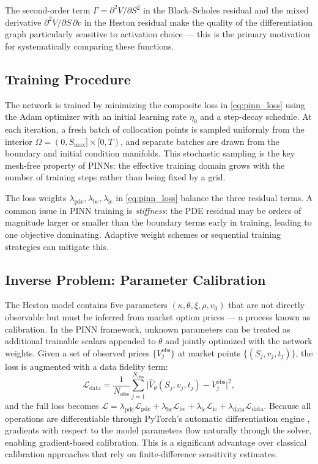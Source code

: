 The second-order term $\Gamma = \partial^2 V/\partial S^2$ in the Black--Scholes residual and the mixed derivative $\partial^2 V/\partial S\,\partial v$ in the Heston residual make the quality of the differentiation graph particularly sensitive to activation choice — this is the primary motivation for systematically comparing these functions.

\subsection{Training Procedure}\label{subsection:training}

The network is trained by minimizing the composite loss in \cref{eq:pinn_loss} using the Adam optimizer \parencite{kingma2015adam} with an initial learning rate $\eta_0$ and a step-decay schedule. At each iteration, a fresh batch of collocation points is sampled uniformly from the interior $\Omega = (0, S_{\max}]\times[0,T)$, and separate batches are drawn from the boundary and initial condition manifolds. This stochastic sampling is the key mesh-free property of PINNs: the effective training domain grows with the number of training steps rather than being fixed by a grid.

The loss weights $\lambda_\text{pde},\lambda_\text{bc},\lambda_\text{ic}$ in \cref{eq:pinn_loss} balance the three residual terms. A common issue in PINN training is \emph{stiffness}: the PDE residual may be orders of magnitude larger or smaller than the boundary terms early in training, leading to one objective dominating. Adaptive weight schemes or sequential training strategies can mitigate this.

\subsection{Inverse Problem: Parameter Calibration}\label{subsection:inverse}

The Heston model contains five parameters $(\kappa, \theta, \xi, \rho, v_0)$ that are not directly observable but must be inferred from market option prices — a process known as calibration. In the PINN framework, unknown parameters can be treated as additional trainable scalars appended to $\theta$ and jointly optimized with the network weights. Given a set of observed prices $\{V^\text{obs}_j\}$ at market points $\{(S_j, v_j, t_j)\}$, the loss is augmented with a data fidelity term:
\[
\mathcal{L}_\text{data} = \frac{1}{N_\text{obs}}\sum_{j=1}^{N_\text{obs}}\bigl|\hat{V}_\theta(S_j,v_j,t_j) - V^\text{obs}_j\bigr|^2,
\]
and the full loss becomes $\mathcal{L} = \lambda_\text{pde}\mathcal{L}_\text{pde} + \lambda_\text{bc}\mathcal{L}_\text{bc} + \lambda_\text{ic}\mathcal{L}_\text{ic} + \lambda_\text{data}\mathcal{L}_\text{data}$. Because all operations are differentiable through PyTorch's automatic differentiation engine \parencite{paszke2019pytorch}, gradients with respect to the model parameters flow naturally through the solver, enabling gradient-based calibration. This is a significant advantage over classical calibration approaches that rely on finite-difference sensitivity estimates.

